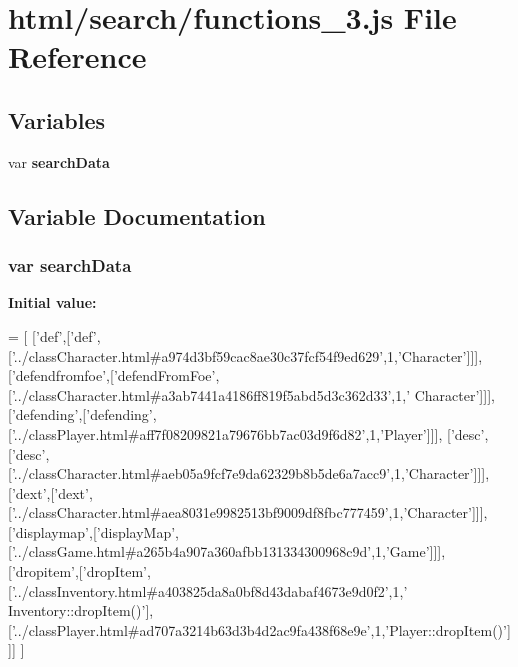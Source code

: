 \section{html/search/functions\-\_\-3.js File Reference}
\label{functions__3_8js}
\subsection*{Variables}
\begin{DoxyCompactItemize}
\item 
var {\bf search\-Data}
\end{DoxyCompactItemize}


\subsection{Variable Documentation}
\subsubsection[{search\-Data}]{\setlength{\rightskip}{0pt plus 5cm}var search\-Data}\label{functions__3_8js_ad01a7523f103d6242ef9b0451861231e}
{\bfseries Initial value\-:}
\begin{DoxyCode}
=
[
  [\textcolor{stringliteral}{'def'},[\textcolor{stringliteral}{'def'},[\textcolor{stringliteral}{'../classCharacter.html#a974d3bf59cac8ae30c37fcf54f9ed629'},1,\textcolor{stringliteral}{'Character'}]]],
  [\textcolor{stringliteral}{'defendfromfoe'},[\textcolor{stringliteral}{'defendFromFoe'},[\textcolor{stringliteral}{'../classCharacter.html#a3ab7441a4186ff819f5abd5d3c362d33'},1,\textcolor{stringliteral}{'
      Character'}]]],
  [\textcolor{stringliteral}{'defending'},[\textcolor{stringliteral}{'defending'},[\textcolor{stringliteral}{'../classPlayer.html#aff7f08209821a79676bb7ac03d9f6d82'},1,\textcolor{stringliteral}{'Player'}]]],
  [\textcolor{stringliteral}{'desc'},[\textcolor{stringliteral}{'desc'},[\textcolor{stringliteral}{'../classCharacter.html#aeb05a9fcf7e9da62329b8b5de6a7acc9'},1,\textcolor{stringliteral}{'Character'}]]],
  [\textcolor{stringliteral}{'dext'},[\textcolor{stringliteral}{'dext'},[\textcolor{stringliteral}{'../classCharacter.html#aea8031e9982513bf9009df8fbc777459'},1,\textcolor{stringliteral}{'Character'}]]],
  [\textcolor{stringliteral}{'displaymap'},[\textcolor{stringliteral}{'displayMap'},[\textcolor{stringliteral}{'../classGame.html#a265b4a907a360afbb131334300968c9d'},1,\textcolor{stringliteral}{'Game'}]]],
  [\textcolor{stringliteral}{'dropitem'},[\textcolor{stringliteral}{'dropItem'},[\textcolor{stringliteral}{'../classInventory.html#a403825da8a0bf8d43dabaf4673e9d0f2'},1,\textcolor{stringliteral}{'
      Inventory::dropItem()'}],[\textcolor{stringliteral}{'../classPlayer.html#ad707a3214b63d3b4d2ac9fa438f68e9e'},1,\textcolor{stringliteral}{'Player::dropItem()'}]]]
]
\end{DoxyCode}
